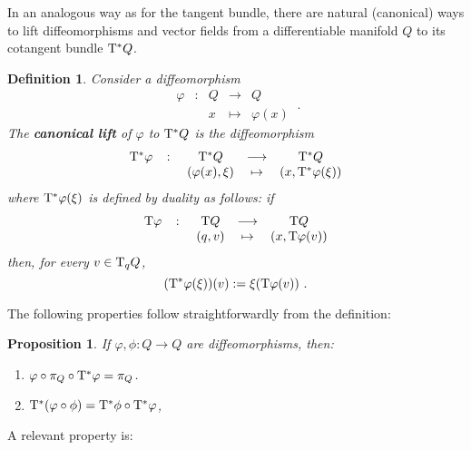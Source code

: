 \documentclass[12pt]{report}
\newtheorem{prop}[teor]{Proposition}
\newtheorem{definition}[teor]{Definition}
\def\ben{\begin{enumerate}}
\def\een{\end{enumerate}}
\def\Tan{{\rm T}}
\begin{document}
\begin{appendix}
In an analogous way as for the tangent bundle, there are
natural (canonical) ways to lift
diffeomorphisms and vector fields from a differentiable manifold $Q$
to its cotangent bundle $\Tan^*Q$.

\begin{definition}
Consider a diffeomorphism
$$
\begin{array}{ccccc}
\varphi&\colon&Q&\longrightarrow&Q
\\
& & x & \mapsto & \varphi(x)
\end{array} \ .
$$
The \textbf{canonical lift} of $\varphi$ to $\Tan^*Q$ is the diffeomorphism
$$
\begin{array}{ccccc}
\Tan^*\varphi&\colon&\Tan^*Q&\longrightarrow&\Tan^*Q
\\
& &(\varphi(x),\xi ) & \mapsto & (x,\Tan^*\varphi (\xi))
\end{array}
$$
where $\Tan^*\varphi (\xi)$ is defined by duality as follows: if
$$
\begin{array}{ccccc}
\Tan\varphi&\colon&\Tan Q&\longrightarrow&\Tan Q
\\
& &(q,v) & \mapsto & (x,\Tan\varphi (v))
\end{array}
$$
then, for every $v\in\Tan_qQ$,
$$
(\Tan^*\varphi(\xi))(v) :=\xi (\Tan\varphi(v)) \ .
$$
\end{definition}

The following properties follow straightforwardly from the definition:

\begin{prop}
\label{exerc2}
If $\varphi,\phi\colon Q\to Q$ are diffeomorphisms, then:
\ben
\item
$\varphi\circ\pi_Q\circ\Tan^*\varphi =\pi_Q$.
\item
$\Tan^*(\varphi\circ\phi )=\Tan^*\phi\circ\Tan^*\varphi$,
\een
\end{prop}

A relevant property is:


\end{appendix}
\end{document}
